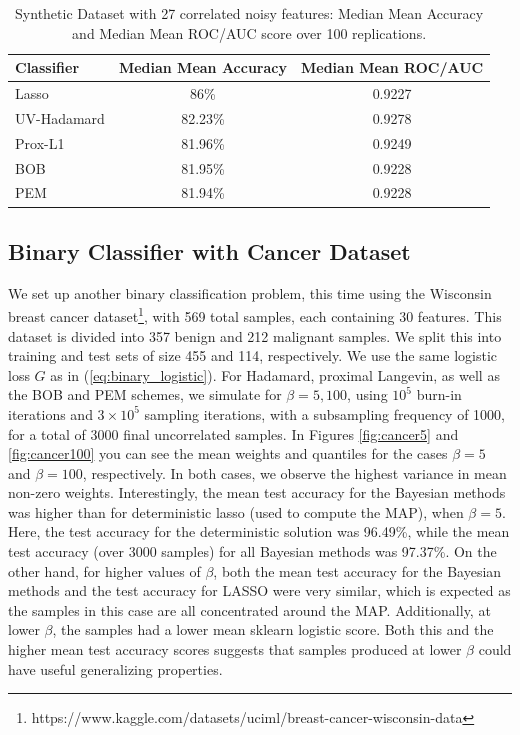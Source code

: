 \documentclass[11pt, twoside]{report}
\begin{document}
\begin{table}[h!]
    \centering
    \begin{tabular}{l c c}
        \hline
        \textbf{Classifier} & \textbf{Median Mean Accuracy} & \textbf{Median Mean ROC/AUC} \\
        \hline
        Lasso & 86\%  & 0.9227  \\
        UV-Hadamard & 82.23\%  & 0.9278  \\
        Prox-L1       & 81.96\%  & 0.9249  \\
        BOB                 & 81.95\%  & 0.9228  \\
        PEM      & 81.94\%  & 0.9228  \\
        \hline
    \end{tabular}
    \caption{Synthetic Dataset with 27 correlated noisy features: Median Mean Accuracy and Median Mean ROC/AUC score over 100 replications.}
    \label{tab:train_test_accuracy_binary_small_corr}
\end{table}

\subsection{Binary Classifier with Cancer Dataset}
We set up another binary classification problem, this time using the Wisconsin breast cancer dataset\footnote{https://www.kaggle.com/datasets/uciml/breast-cancer-wisconsin-data}, with 569 total samples, each containing 30 features. This dataset is divided into 357 benign and 212 malignant samples. We split this into training and test sets of size 455 and 114, respectively. We use the same logistic loss $G$ as in (\ref{eq:binary_logistic}). For Hadamard, proximal Langevin, as well as the BOB and PEM schemes, we simulate for $\beta = 5, 100$, using $10^5$ burn-in iterations and $3\times10^5$ sampling iterations, with a subsampling frequency of 1000, for a total of 3000 final uncorrelated samples. In Figures \ref{fig:cancer5} and \ref{fig:cancer100} you can see the mean weights and quantiles for the cases $\beta = 5$ and $\beta = 100$, respectively. In both cases, we observe the highest variance in mean non-zero weights. Interestingly, the mean test accuracy for the Bayesian methods was higher than for deterministic lasso (used to compute the MAP), when $\beta = 5$. Here, the test accuracy for the deterministic solution was 96.49\%, while the mean test accuracy (over 3000 samples) for all Bayesian methods was 97.37\%. On the other hand, for higher values of $\beta$, both the mean test accuracy for the Bayesian methods and the test accuracy for LASSO were very similar, which is expected as the samples in this case are all concentrated around the MAP. Additionally, at lower $\beta$, the samples had a lower mean sklearn logistic score. Both this and the higher mean test accuracy scores suggests that samples produced at lower $\beta$ could have useful generalizing properties.
\end{document}
